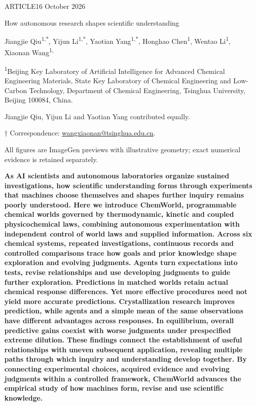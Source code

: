 \documentclass[12pt,a4paper]{article}
\begin{document}
\doublespacing

\begingroup\singlespacing
{\sffamily\small ARTICLE\hfill 16 October 2026\par}
\vspace{8pt}
{\sffamily\LARGE\bfseries\raggedright{} How autonomous research shapes scientific understanding\par}
\vspace{8pt}
{\normalsize Jiangjie Qiu\textsuperscript{1,*}, Yijun Li\textsuperscript{1,*}, Yaotian Yang\textsuperscript{1,*}, Honghao Chen\textsuperscript{1}, Wentao Li\textsuperscript{1}, Xiaonan Wang\textsuperscript{1,\textdagger}\par}
{\footnotesize\textsuperscript{1}Beijing Key Laboratory of Artificial Intelligence for Advanced Chemical Engineering Materials, State Key Laboratory of Chemical Engineering and Low-Carbon Technology, Department of Chemical Engineering, Tsinghua University, Beijing 100084, China.\par}
{\footnotesize * Jiangjie Qiu, Yijun Li and Yaotian Yang contributed equally.\par}
{\footnotesize $\dagger$ Correspondence: \href{mailto:wangxiaonan@tsinghua.edu.cn}{wangxiaonan@tsinghua.edu.cn}.\par}
\vspace{6pt}
{\sffamily\footnotesize All figures are ImageGen previews with illustrative geometry; exact numerical evidence is retained separately.\par}
\vspace{8pt}
\endgroup
\textbf{As AI scientists and autonomous laboratories organize sustained investigations, how scientific understanding forms through experiments that machines choose themselves and shapes further inquiry remains poorly understood. Here we introduce ChemWorld, programmable chemical worlds governed by thermodynamic, kinetic and coupled physicochemical laws, combining autonomous experimentation with independent control of world laws and supplied information. Across six chemical systems, repeated investigations, continuous records and controlled comparisons trace how goals and prior knowledge shape exploration and evolving judgments. Agents turn expectations into tests, revise relationships and use developing judgments to guide further exploration. Predictions in matched worlds retain actual chemical response differences. Yet more effective procedures need not yield more accurate predictions. Crystallization research improves prediction, while agents and a simple mean of the same observations have different advantages across responses. In equilibrium, overall predictive gains coexist with worse judgments under prespecified extreme dilution. These findings connect the establishment of useful relationships with uneven subsequent application, revealing multiple paths through which inquiry and understanding develop together. By connecting experimental choices, acquired evidence and evolving judgments within a controlled framework, ChemWorld advances the empirical study of how machines form, revise and use scientific knowledge.}
\end{document}
